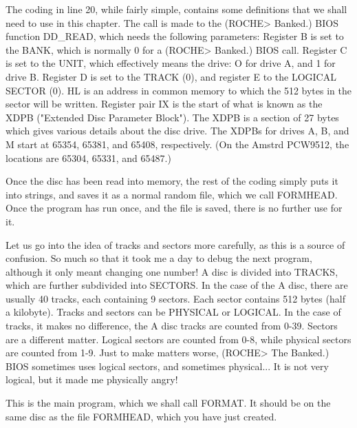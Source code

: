 The coding in line 20, while fairly simple, contains some definitions that  we 
shall  need to use in this chapter. The call is made to the  (ROCHE>  Banked.) 
BIOS function DD_READ, which needs the following parameters: Register B is set 
to the BANK, which is normally 0 for a (ROCHE> Banked.) BIOS call. Register  C 
is  set to the UNIT, which effectively means the drive: O for drive A,  and  1 
for drive B. Register D is set to the TRACK (0), and register E to the LOGICAL 
SECTOR  (0). HL is an address in common memory to which the 512 bytes  in  the 
sector will be written. Register pair IX is the start of what is known as  the 
XDPB  ("Extended  Disc Parameter Block"). The XDPB is a section  of  27  bytes 
which  gives various details about the disc drive. The XDPBs for drives A,  B, 
and M start at 65354, 65381, and 65408, respectively. (On the Amstrd  PCW9512, 
the locations are 65304, 65331, and 65487.)

Once the disc has been read into memory, the rest of the coding simply puts it 
into  strings, and saves it as a normal random file, which we  call  FORMHEAD. 
Once the program has run once, and the file is saved, there is no further  use 
for it.

Let  us  go into the idea of tracks and sectors more carefully, as this  is  a 
source  of  confusion.  So much so that it took me a day  to  debug  the  next 
program,  although it only meant changing one number! A disc is  divided  into 
TRACKS, which are further subdivided into SECTORS. In the case of the A  disc, 
there  are usually 40 tracks, each containing 9 sectors. Each sector  contains 
512 bytes (half a kilobyte). Tracks and sectors can be PHYSICAL or LOGICAL. In 
the case of tracks, it makes no difference, the A disc tracks are counted from 
0-39.  Sectors are a different matter. Logical sectors are counted  from  0-8, 
while  physical  sectors  are counted from 1-9. Just to  make  matters  worse, 
(ROCHE>  The  Banked.)  BIOS sometimes uses  logical  sectors,  and  sometimes 
physical... It is not very logical, but it made me physically angry!

This is the main program, which we shall call FORMAT. It should be on the same 
disc as the file FORMHEAD, which you have just created.

